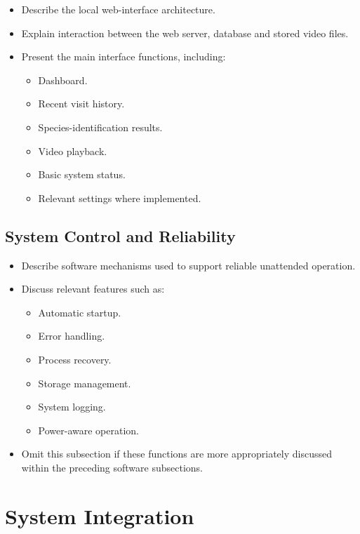 \begin{itemize}
    \item Describe the local web-interface architecture.
    \item Explain interaction between the web server, database and stored video files.
    \item Present the main interface functions, including:
    \begin{itemize}
        \item Dashboard.
        \item Recent visit history.
        \item Species-identification results.
        \item Video playback.
        \item Basic system status.
        \item Relevant settings where implemented.
    \end{itemize}
\end{itemize}


\subsection{System Control and Reliability}
\label{subsec:SystemControlReliability}

\begin{itemize}
    \item Describe software mechanisms used to support reliable unattended operation.
    \item Discuss relevant features such as:
    \begin{itemize}
        \item Automatic startup.
        \item Error handling.
        \item Process recovery.
        \item Storage management.
        \item System logging.
        \item Power-aware operation.
    \end{itemize}
    \item Omit this subsection if these functions are more appropriately discussed within the preceding software subsections.
\end{itemize}


\section{System Integration}
\label{sec:SystemIntegration}

